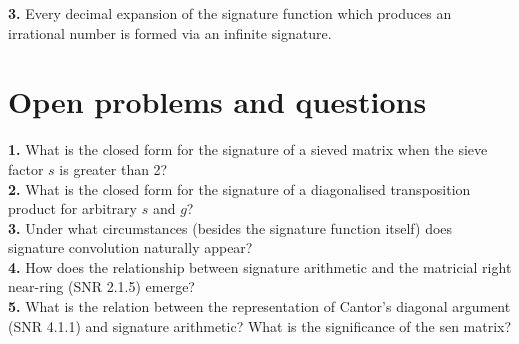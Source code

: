 \documentclass{article}
\begin{document}
\noindent \textbf{3.} Every decimal expansion of the signature function which produces an irrational number is formed via an infinite signature.

\section{Open problems and questions}

\textbf{1.} What is the closed form for the signature of a sieved matrix when the sieve factor $s$ is greater than 2?\\

\noindent \textbf{2.} What is the closed form for the signature of a diagonalised transposition product for arbitrary $s$ and $g$?\\

\noindent \textbf{3.} Under what circumstances (besides the signature function itself) does signature convolution naturally appear?\\

\noindent \textbf{4.} How does the relationship between signature arithmetic and the matricial right near-ring (SNR 2.1.5) emerge?\\

\noindent \textbf{5.} What is the relation between the representation of Cantor's diagonal argument (SNR 4.1.1) and signature arithmetic? What is the significance of the sen matrix?\\
\end{document}

